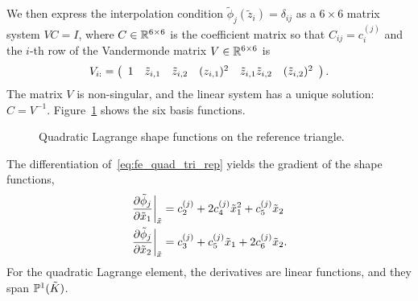 We then express the interpolation condition $\tilde \phi_j(\tilde z_i) = \delta_{ij}$ as a $6 \times 6$ matrix system $VC = I$, where $C \in \RR^{6 \times 6}$ is the coefficient matrix so that $C_{ij} = c^{(j)}_i$ and the $i$-th row of the Vandermonde matrix $V \in \RR^{6 \times 6}$ is
\begin{equation*}
  V_{i:} = \bmat{cccccc} 1 & \tilde z_{i,1} & \tilde z_{i,2} &  (z_{i,1})^2 & \tilde z_{i,1} \tilde z_{i,2} & (\tilde z_{i,2})^2 \emat .
\end{equation*}
The matrix $V$ is non-singular, and the linear system has a unique solution: $C = V^{-1}$.  Figure~\ref{fig:fe_shape_tri_p2} shows the six basis functions.
\begin{figure}
  \centering
  \caption{Quadratic Lagrange shape functions on the reference triangle.}
  \label{fig:fe_shape_tri_p2}
\end{figure}
 The differentiation of~\eqref{eq:fe_quad_tri_rep} yields the gradient of the shape functions,
\begin{align*}
  \left. \pp{\tilde \phi_j}{\tilde x_1} \right|_{\tilde x} &= c^{(j)}_2 + 2 c^{(j)}_4 \tilde x^2_1 + c^{(j)}_5 \tilde x_2
  \\
  \left. \pp{\tilde \phi_j}{\tilde x_2} \right|_{\tilde x}&= c^{(j)}_3 + c^{(j)}_5 \tilde x_1 + 2 c^{(j)}_6 \tilde x_2.
\end{align*}
For the quadratic Lagrange element, the derivatives are linear functions, and they span $\PP^1(\tilde K)$.


